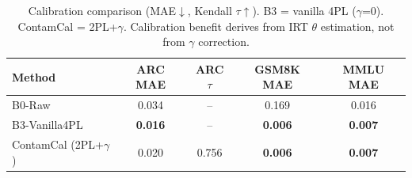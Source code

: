 \begin{table}[t]
\centering
\caption{Calibration comparison (MAE$\downarrow$, Kendall $\tau$$\uparrow$). B3 = vanilla 4PL ($\gamma$=0). ContamCal = 2PL+$\gamma$. Calibration benefit derives from IRT $\theta$ estimation, not from $\gamma$ correction.}
\label{tab:baselines}
\small
\begin{tabular}{lcccc}
\toprule
Method & ARC MAE & ARC $\tau$ & GSM8K MAE & MMLU MAE \\
\midrule
B0-Raw & 0.034 & -- & 0.169 & 0.016 \\
B3-Vanilla4PL & \textbf{0.016} & -- & \textbf{0.006} & \textbf{0.007} \\
ContamCal (2PL+$\gamma$) & 0.020 & 0.756 & \textbf{0.006} & \textbf{0.007} \\
\bottomrule
\end{tabular}
\end{table}
